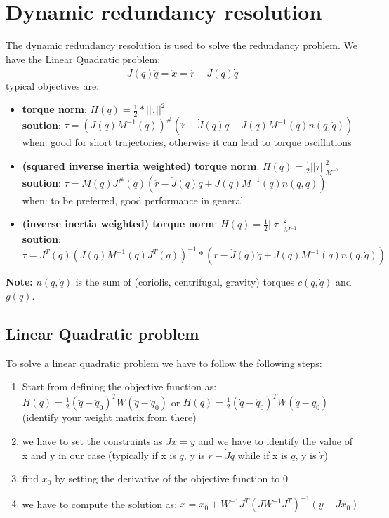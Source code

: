 \documentclass[a4paper,12pt]{article}
\begin{document}
\section{Dynamic redundancy resolution}
The dynamic redundancy resolution is used to solve the redundancy problem.
We have the Linear Quadratic problem:
\begin{equation}
    J(q) \ddot{q} = \ddot{x}= \ddot{r}-\dot{J}(q)\dot{q}
\end{equation}
typical objectives are:
\begin{itemize}
    \item \textbf{torque norm}: $H(q)=\frac{1}{2}*||\tau||^2$\\
    \textbf{soution}: $\tau= (J(q)M^{-1}(q))^{\#}(\ddot{r}-\dot{J}(q)\dot{q}+J(q)M^{-1}(q)n(q,\dot{q}))$\\
    when: good for short trajectories, otherwise it can lead to torque oscillations
    \item \textbf{(squared inverse inertia weighted) torque norm}: $H(q)=\frac{1}{2} ||\tau||^2_{ M^{-2}}$\\
    \textbf{soution}: $\tau= M(q)J^{\#}(q)(\ddot{r}-\dot{J}(q)\dot{q}+J(q)M^{-1}(q)n(q,\dot{q}))$\\
    when: to be preferred, good performance in general
    \item \textbf{(inverse inertia weighted) torque norm}: $H(q)=\frac{1}{2} ||\tau||^2_{ M^{-1}}$\\
    \textbf{soution}: $\tau= J^T(q)(J(q)M^{-1}(q)J^T(q))^{-1}*(\ddot{r}-\dot{J}(q)\dot{q}+J(q)M^{-1}(q)n(q,\dot{q}))$
\end{itemize}
\textbf{Note:} $n(q,\dot{q})$ is the sum of (coriolis, centrifugal, gravity) torques $c(q,\dot{q})$ and $g(\dot{q})$.
\subsection{Linear Quadratic problem}
To solve a linear quadratic problem we have to follow the following steps:
\begin{enumerate}
    \item Start from defining the objective function as: $H(q)=\frac{1}{2}(\ddot{q}-\ddot{q}_0)^T W (\ddot{q}-\ddot{q}_0)$
     or $H(q)=\frac{1}{2}(\dot{q}-\dot{q}_0)^T W (\dot{q}-\dot{q}_0)$ (identify your weight matrix from there)
     \item we have to set the constraints as $Jx=y$ and we have to identify 
        the value of x and y in our case (typically if x is $\ddot{q}$, y is $\ddot{r}-\dot{J}\dot{q}$
         while if x is $\dot{q}$, y is $\dot{r}$)
    \item find $x_0$ by setting the derivative of the objective function to 0
    \item we have to compute the solution as: $x = x_0 + W^{-1}J^T(JW^{-1}J^T)^{-1}(y-Jx_0)$
\end{enumerate}
\end{document}
